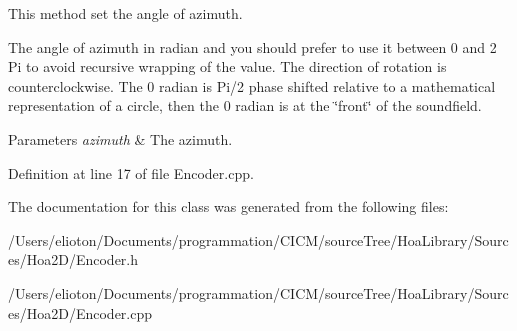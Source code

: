 This method set the angle of azimuth. 

The angle of azimuth in radian and you should prefer to use it between 0 and 2 Pi to avoid recursive wrapping of the value. The direction of rotation is counterclockwise. The 0 radian is Pi/2 phase shifted relative to a mathematical representation of a circle, then the 0 radian is at the \char`\"{}front\char`\"{} of the soundfield.


\begin{DoxyParams}{Parameters}
{\em azimuth} & The azimuth. \\
\hline
\end{DoxyParams}


Definition at line 17 of file Encoder.\-cpp.



The documentation for this class was generated from the following files\-:\begin{DoxyCompactItemize}
\item 
/\-Users/elioton/\-Documents/programmation/\-C\-I\-C\-M/source\-Tree/\-Hoa\-Library/\-Sources/\-Hoa2\-D/Encoder.\-h\item 
/\-Users/elioton/\-Documents/programmation/\-C\-I\-C\-M/source\-Tree/\-Hoa\-Library/\-Sources/\-Hoa2\-D/Encoder.\-cpp\end{DoxyCompactItemize}
